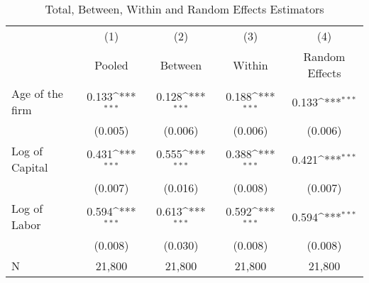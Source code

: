 \begin{table}[htbp]\centering
\def\sym#1{\ifmmode^{#1}\else\(^{#1}\)\fi}
\caption{Total, Between, Within and Random Effects Estimators \label{tab:q2}}
\begin{tabular}{l*{4}{c}}
\toprule
                    &\multicolumn{1}{c}{(1)}&\multicolumn{1}{c}{(2)}&\multicolumn{1}{c}{(3)}&\multicolumn{1}{c}{(4)}\\
                    &\multicolumn{1}{c}{Pooled}&\multicolumn{1}{c}{Between}&\multicolumn{1}{c}{Within}&\multicolumn{1}{c}{Random Effects}\\
\midrule
Age of the firm     &       0.133\sym{***}&       0.128\sym{***}&       0.188\sym{***}&       0.133\sym{***}\\
                    &     (0.005)         &     (0.006)         &     (0.006)         &     (0.006)         \\
\addlinespace
Log of Capital      &       0.431\sym{***}&       0.555\sym{***}&       0.388\sym{***}&       0.421\sym{***}\\
                    &     (0.007)         &     (0.016)         &     (0.008)         &     (0.007)         \\
\addlinespace
Log of Labor        &       0.594\sym{***}&       0.613\sym{***}&       0.592\sym{***}&       0.594\sym{***}\\
                    &     (0.008)         &     (0.030)         &     (0.008)         &     (0.008)         \\
\midrule
N                   &      21,800         &      21,800         &      21,800         &      21,800         \\
\bottomrule
\end{tabular}
\end{table}
